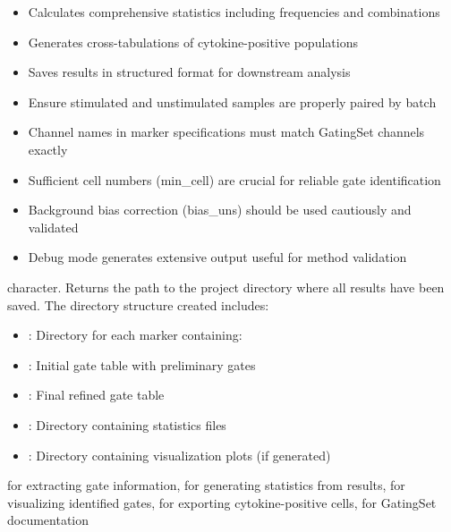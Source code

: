 \documentclass[letterpaper]{book}
\begin{document}
\begin{Details}
\begin{itemize}

\item{} Calculates comprehensive statistics including frequencies and combinations
\item{} Generates cross-tabulations of cytokine-positive populations
\item{} Saves results in structured format for downstream analysis

\end{itemize}


\begin{itemize}

\item{} Ensure stimulated and unstimulated samples are properly paired by batch
\item{} Channel names in marker specifications must match GatingSet channels exactly
\item{} Sufficient cell numbers (min\_cell) are crucial for reliable gate identification
\item{} Background bias correction (bias\_uns) should be used cautiously and validated
\item{} Debug mode generates extensive output useful for method validation

\end{itemize}

\end{Details}
%
\begin{Value}
character. Returns the path to the project directory where all results
have been saved. The directory structure created includes:
\begin{itemize}

\item{} : Directory for each marker containing:
\item{} : Initial gate table with preliminary gates
\item{} : Final refined gate table
\item{} : Directory containing statistics files
\item{} : Directory containing visualization plots (if generated)

\end{itemize}

\end{Value}
%
\begin{SeeAlso}
 for extracting gate information,
 for generating statistics from results,
 for visualizing identified gates,
 for exporting cytokine-positive cells,
 for GatingSet documentation
\end{SeeAlso}
\end{document}
